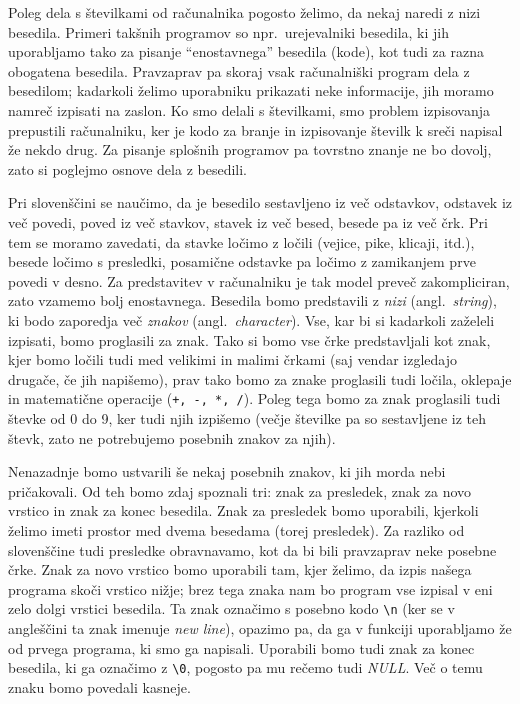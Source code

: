 Poleg dela s številkami od računalnika pogosto želimo, da nekaj naredi z nizi
besedila.
Primeri takšnih programov so npr.~urejevalniki besedila, ki jih uporabljamo tako
za pisanje \enquote{enostavnega} besedila (kode), kot tudi za razna obogatena
besedila.
Pravzaprav pa skoraj vsak računalniški program dela z besedilom; kadarkoli
želimo uporabniku prikazati neke informacije, jih moramo namreč izpisati na
zaslon.
Ko smo delali s številkami, smo problem izpisovanja prepustili računalniku, ker
je kodo za branje in izpisovanje številk k sreči napisal že nekdo drug.
Za pisanje splošnih programov pa tovrstno znanje ne bo dovolj, zato si poglejmo
osnove dela z besedili.

Pri slovenščini se naučimo, da je besedilo sestavljeno iz več odstavkov,
odstavek iz več povedi, poved iz več stavkov, stavek iz več besed, besede pa iz
več črk.
Pri tem se moramo zavedati, da stavke ločimo z ločili (vejice, pike, klicaji,
itd.), besede ločimo s presledki, posamične odstavke pa ločimo z zamikanjem prve
povedi v desno.
Za predstavitev v računalniku je tak model preveč zakompliciran, zato vzamemo
bolj enostavnega.
Besedila bomo predstavili z \emph{nizi} (angl.~\emph{string}), ki bodo
zaporedja več \emph{znakov} (angl.~\emph{character}).
Vse, kar bi si kadarkoli zaželeli izpisati, bomo proglasili za znak.
Tako si bomo vse črke predstavljali kot znak, kjer bomo ločili tudi med velikimi
in malimi črkami (saj vendar izgledajo drugače, če jih napišemo), prav tako bomo
za znake proglasili tudi ločila, oklepaje in matematične operacije
(\verb|+, -, *, /|).
Poleg tega bomo za znak proglasili tudi števke od 0 do 9, ker tudi njih
izpišemo (večje številke pa so sestavljene iz teh števk, zato ne potrebujemo
posebnih znakov za njih).

Nenazadnje bomo ustvarili še nekaj posebnih znakov, ki jih morda nebi
pričakovali.
Od teh bomo zdaj spoznali tri: znak za presledek, znak za novo vrstico in znak
za konec besedila.
Znak za presledek bomo uporabili, kjerkoli želimo imeti prostor med dvema
besedama (torej presledek).
Za razliko od slovenščine tudi presledke obravnavamo, kot da bi bili pravzaprav
neke posebne črke.
Znak za novo vrstico bomo uporabili tam, kjer želimo, da izpis našega programa
skoči vrstico nižje; brez tega znaka nam bo program vse izpisal v eni zelo dolgi
vrstici besedila.
Ta znak označimo s posebno kodo \verb+\n+ (ker se v angleščini ta znak imenuje
\emph{new line}), opazimo pa, da ga v funkciji  uporabljamo že od
prvega programa, ki smo ga napisali.
Uporabili bomo tudi znak za konec besedila, ki ga označimo z \verb+\0+,
pogosto pa mu rečemo tudi \emph{NULL}.
Več o temu znaku bomo povedali kasneje.

